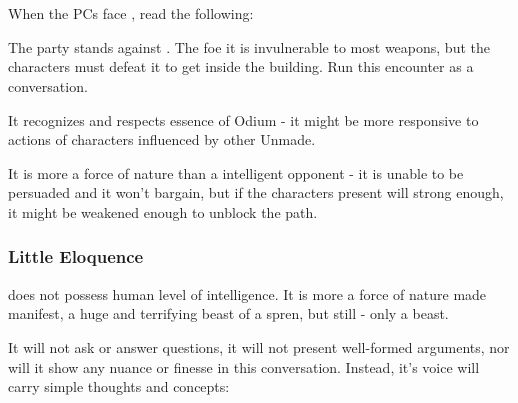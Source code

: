 \section{\npcHeartRevelTitle}
\label{sec:heartOfTheRevel}

When the PCs face \npcHeartRevelTitle{}, read the following:


The party stands against \enemyHeartOfTheRevel{}. The foe it is invulnerable to most weapons, but the characters must defeat it to get inside the building. Run this encounter as a conversation.

It recognizes and respects essence of Odium - it might be more responsive to actions of characters influenced by other Unmade.

It is more a force of nature than a intelligent opponent - it is unable to be persuaded and it won't bargain, but if the characters present will strong enough, it might be weakened enough to unblock the path. 




\subsubsection{Little Eloquence}

\npcHeartRevelTitle{} does not possess human level of intelligence. It is more a force of nature made manifest, a huge and terrifying beast of a spren, but still - only a beast. 

It will not ask or answer questions, it will not present well-formed arguments, nor will it show any nuance or finesse in this conversation. Instead, it's voice will carry simple thoughts and concepts:

